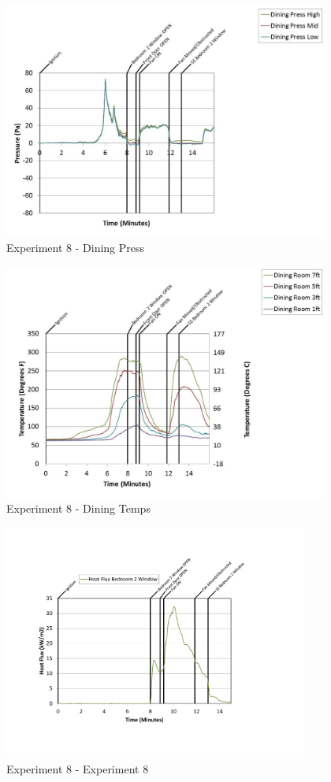 \documentclass{article}
\begin{document}
\begin{appendices}
	\clearpage

	\begin{figure}[h!]
		\centering
		\includegraphics[height=3.05in]{0_Images/Results_Charts/Exp_8_Charts/DiningPress.pdf}
		\caption{Experiment 8 - Dining Press}
	\end{figure}
 

	\begin{figure}[h!]
		\centering
		\includegraphics[height=3.05in]{0_Images/Results_Charts/Exp_8_Charts/DiningTemps.pdf}
		\caption{Experiment 8 - Dining Temps}
	\end{figure}
 
	\clearpage

	\begin{figure}[h!]
		\centering
		\includegraphics[height=3.05in]{0_Images/Results_Charts/Exp_8_Charts/Experiment8.pdf}
		\caption{Experiment 8 - Experiment 8}
	\end{figure}
 


\end{appendices}
\end{document}

